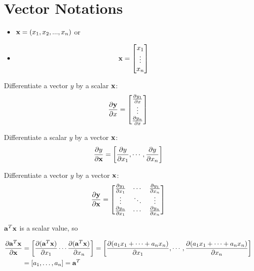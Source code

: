 \section{Vector Notations}

\begin{itemize}
	\item ${\mathbf{x}} = (x_1, x_2,..., x_n)$ or
	\item 
		\begin{align*}
			{\mathbf{x}} = \begin{bmatrix}x_1\\ \vdots\\ x_n\end{bmatrix}
		\end{align*}
\end{itemize}

Differentiate a vector $y$ by a scalar ${\mathbf{x}}$:
\begin{align*}
	\frac{\partial {\mathbf{y}}}{\partial x} = \begin{bmatrix}\frac{\partial y_1}{\partial x}\\ \vdots\\ \frac{\partial y_n}{\partial x}\end{bmatrix}
\end{align*}

Differentiate a scalar $y$ by a vector ${\mathbf{x}}$:
\begin{align*}
	\frac{\partial y}{\partial {\mathbf{x}}} = \bigg[\frac{\partial y}{\partial x_1}, \cdots, \frac{\partial y}{\partial x_n}\bigg]
\end{align*}

Differentiate a vector $y$ by a vector ${\mathbf{x}}$:
\begin{align*}
	\frac{\partial {\mathbf{y}}}{\partial {\mathbf{x}}} = \begin{bmatrix}
		\frac{\partial y_1}{\partial x_1} & \cdots & \frac{\partial y_1}{\partial x_n}\\ 
		\vdots & \ddots & \vdots\\ 
		\frac{\partial y_n}{\partial x_1} & \cdots & \frac{\partial y_n}{\partial x_n}
\end{bmatrix}
\end{align*}

${\mathbf{a}}^T{\mathbf{x}}$ is a scalar value, so 

\begin{align*}
	\frac{\partial {\mathbf{a}}^T{\mathbf{x}}}{\partial {\mathbf{x}}} &= \bigg[\frac{\partial ({\mathbf{a}}^T{\mathbf{x}})}{\partial x_1} \cdots \frac{\partial ({\mathbf{a}}^T{\mathbf{x}})}{\partial x_n}\bigg] = \bigg[\frac{\partial (a_1x_1+\dots+a_nx_n)}{\partial x_1}, \cdots, \frac{\partial (a_1x_1+\dots+a_nx_n)}{\partial x_n}\bigg]\\ 
	&= [a_1, \dots, a_n] = {\mathbf{a}}^T
\end{align*}

